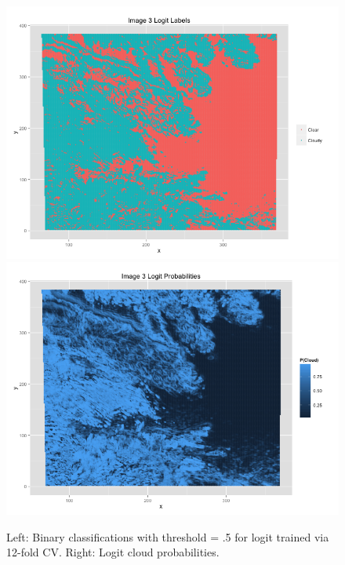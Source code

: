 \documentclass{article}\usepackage[]{graphicx}\usepackage[]{color}
\begin{document}
\begin{figure}
\includegraphics[scale = .35]{Image3FullLogit.png}
\includegraphics[scale = .35]{Image3FullLogitProb.png}

\caption{Left: Binary classifications with threshold = .5 for logit trained via 12-fold CV. Right: Logit cloud probabilities.}
\end{figure}
\end{document}
